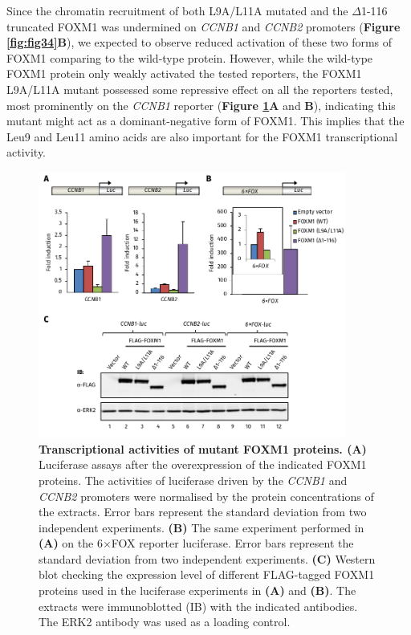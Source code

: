 Since the chromatin recruitment of both L9A/L11A mutated and the $\Delta$1-116 truncated FOXM1 was undermined on \textit{CCNB1} and \textit{CCNB2} promoters (\textbf{Figure \ref{fig:fig34}B}), we expected to observe reduced activation of these two forms of FOXM1 comparing to the wild-type protein. However, while the wild-type FOXM1 protein only weakly activated the tested reporters, the FOXM1 L9A/L11A mutant possessed some repressive effect on all the reporters tested, most prominently on the \textit{CCNB1} reporter (\textbf{Figure \ref{fig:fig35}A} and \textbf{B}), indicating this mutant might act as a dominant-negative form of FOXM1. This implies that the Leu9 and Leu11 amino acids are also important for the FOXM1 transcriptional activity.

\begin{figure}[!h]
    \centering
    \includegraphics[width=0.9\textwidth]{chapter3/figures_foxm1/fig35.pdf}
    \caption[Transcriptional activities of mutant FOXM1 proteins]{\textbf{Transcriptional activities of mutant FOXM1 proteins. (A)} Luciferase assays after the overexpression of the indicated FOXM1 proteins. The activities of luciferase driven by the \textit{CCNB1} and \textit{CCNB2} promoters were normalised by the protein concentrations of the extracts. Error bars represent the standard deviation from two independent experiments. \textbf{(B)} The same experiment performed in \textbf{(A)} on the 6$\times$FOX reporter luciferase. Error bars represent the standard deviation from two independent experiments. \textbf{(C)} Western blot checking the expression level of different FLAG-tagged FOXM1 proteins used in the luciferase experiments in \textbf{(A)} and \textbf{(B)}. The extracts were immunoblotted (IB) with the indicated antibodies. The ERK2 antibody was used as a loading control.}
    \label{fig:fig35}
\end{figure}

